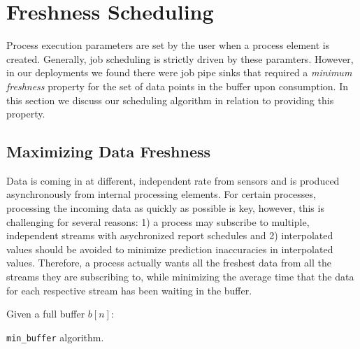 \section{Freshness Scheduling}
Process execution parameters are set by the user when a process element is created.  Generally, job scheduling is strictly driven
by these paramters.  However, in our deployments we found there were job pipe sinks that required a \emph{minimum freshness}
property for the set of data points in the buffer upon consumption.  In this section we discuss our scheduling algorithm in
relation to providing this property.%


\subsection{Maximizing Data Freshness}
\label{sec:freshness}

Data is coming in at different, independent rate from sensors and is produced asynchronously from internal processing elements.
For certain processes, processing the incoming data as quickly as possible is key, however, this is challenging for several reasons:
1) a process may subscribe to multiple, independent streams with asychronized report schedules and 2) interpolated values
should be avoided to minimize prediction inaccuracies in interpolated values.  Therefore, a process actually wants all the freshest
data from all the streams they are subscribing to, while minimizing the average time that the data for each respective stream has 
been waiting in the buffer.


\begin{algorithm}[h!]
 \SetAlgoLined
 Given a full buffer $b[n]$:\\
 \caption{\texttt{min\_buffer} algorithm.}
 \label{alg:min_buffer}
\end{algorithm}

